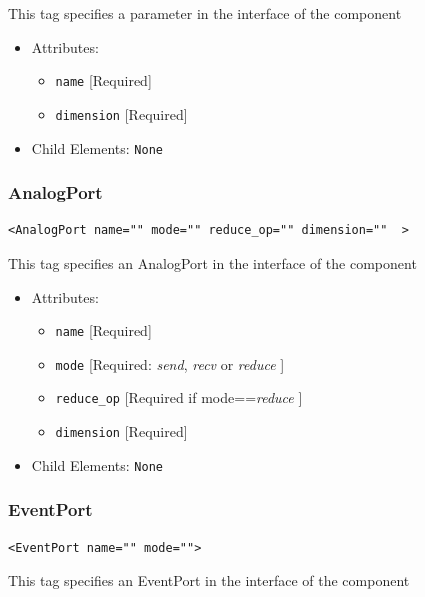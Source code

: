 \documentclass{article}
\begin{document}
This tag specifies a parameter in the interface of the component

\begin{itemize}
\item Attributes:
%
\begin{itemize}
\item \verb|name| {[}Required{]}
\item \verb|dimension| {[}Required{]}
\end{itemize}

\item Child Elements: \texttt{None}
\end{itemize}




\subsubsection{AnalogPort}
%
\begin{lstlisting}
<AnalogPort name="" mode="" reduce_op="" dimension=""  >
\end{lstlisting}

This tag specifies an AnalogPort in the interface of the component

\begin{itemize}
\item Attributes:
%
\begin{itemize}
\item \verb|name| {[}Required{]}
\item \verb|mode| {[}Required: \emph{send}, \emph{recv} or \emph{reduce} {]}
\item \verb|reduce_op| {[}Required if mode==\emph{reduce} {]}
\item \verb|dimension| {[}Required{]}
\end{itemize}

\item Child Elements: \texttt{None}
\end{itemize}





\subsubsection{EventPort}
%
\begin{lstlisting}
<EventPort name="" mode="">
\end{lstlisting}

This tag specifies an EventPort in the interface of the component
\end{document}
